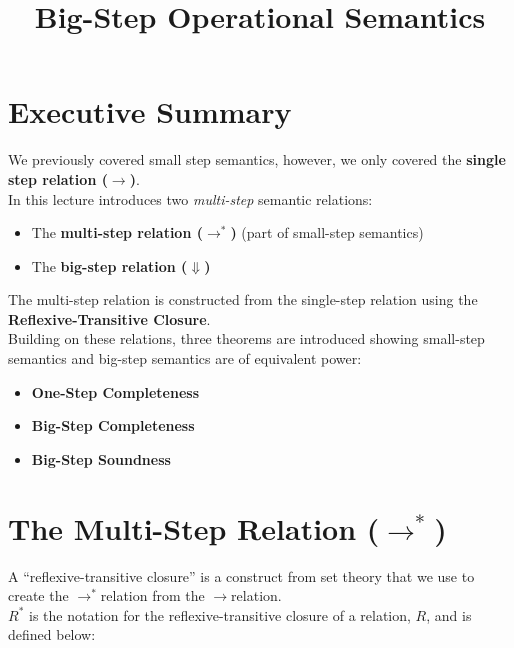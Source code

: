 \documentclass{lecturenotes}
\title{Big-Step Operational Semantics}
\newcommand{\singlestep}{\ensuremath{\rightarrow}}
\newcommand{\multistep}{\ensuremath{\rightarrow^*}}
\newcommand{\bigstep}{\ensuremath{\Downarrow}}
\begin{document}
\maketitle

\section{Executive Summary}
\label{sec:executive-summary}

We previously covered small step semantics, however, we only covered the \textbf{single step relation (\singlestep)}. \\

\noindent
In this lecture introduces two \emph{multi-step} semantic relations:
\begin{itemize}
\item The \textbf{multi-step relation (\multistep)} (part of small-step semantics)
\item The \textbf{big-step relation (\bigstep)}
\end{itemize}

\noindent
The multi-step relation is constructed from the single-step relation using the \textbf{Reflexive-Transitive Closure}. \\

\noindent
Building on these relations, three theorems are introduced showing small-step semantics and big-step semantics are of equivalent power:
\begin{itemize}
\item \textbf{One-Step Completeness}
\item \textbf{Big-Step Completeness}
\item \textbf{Big-Step Soundness}
\end{itemize}

\section{The Multi-Step Relation (\multistep)}
\label{sec:multi-step-relation}

A ``reflexive-transitive closure'' is a construct from set theory that we use to create the \multistep relation from the \singlestep relation. \\

\noindent
$R^*$ is the notation for the reflexive-transitive closure of a relation, $R$, and is defined below:
\noindent
{} \\
\end{document}

